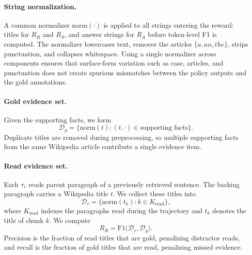 \documentclass[11pt]{article}
\begin{document}
\paragraph{String normalization.}
A common normalizer $\mathrm{norm}(\cdot)$ is applied to all strings entering the reward: titles for $R_R$ and $R_S$, and answer strings for $R_A$ before token-level F1 is computed. The normalizer lowercases text, removes the articles $\{a, an, the\}$, strips punctuation, and collapses whitespace. Using a single normalizer across components ensures that surface-form variation such as case, articles, and punctuation does not create spurious mismatches between the policy outputs and the gold annotations.

\paragraph{Gold evidence set.}
Given the supporting facts, we form
\[
\mathcal{D}_g
=
\big\{
\mathrm{norm}(t) : (t,\cdot)\in\text{supporting facts}
\big\}.
\]
Duplicate titles are removed during preprocessing, so multiple supporting facts from the same Wikipedia article contribute a single evidence item.

\paragraph{Read evidence set.}
Each $\tau_r$ reads parent paragraph of a previously retrieved sentence. The backing paragraph carries a Wikipedia title $t$. We collect these titles into
\[
\mathcal{D}_r
=
\big\{
\mathrm{norm}(t_k) : k \in K_{\mathrm{read}}
\big\},
\]
where $K_{\mathrm{read}}$ indexes the paragraphs read during the trajectory and $t_k$ denotes the title of chunk $k$. We compute
\[
R_R
=
\mathrm{F1}
\big(
\mathcal{D}_r,
\mathcal{D}_g
\big).
\]
Precision is the fraction of read titles that are gold, penalizing distractor reads, and recall is the fraction of gold titles that are read, penalizing missed evidence.

\end{document}
